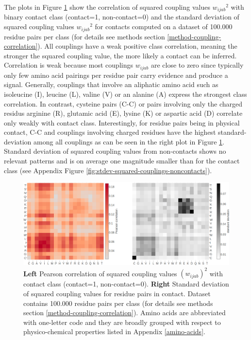 \documentclass[11pt,a4paper,twoside]{book}
\newcommand{\wijab}{w_{ijab}}
\theoremstyle{definition}
\theoremstyle{definition}
\theoremstyle{remark}
\begin{document}
The plots in Figure \ref{fig:sq-coupling-correlation} show the
correlation of squared coupling values \({\wijab}^2\) with binary
contact class (contact=1, non-contact=0) and the standard deviation of
squared coupling values \({\wijab}^2\) for contacts computed on a
dataset of 100.000 residue pairs per class (for details see methods
section \ref{method-coupling-correlation}). All couplings have a weak
positive class correlation, meaning the stronger the squared coupling
value, the more likely a contact can be inferred. Correlation is weak
because most couplings \(\wijab\) are close to zero since typically only
few amino acid pairings per residue pair carry evidence and produce a
signal. Generally, couplings that involve an aliphatic amino acid such
as isoleucine (I), leucine (L), valine (V) or an alanine (A) express the
strongest class correlation. In contrast, cysteine pairs (C-C) or pairs
involving only the charged residus arginine (R), glutamic acid (E),
lysine (K) or aspartic acid (D) correlate only weakly with contact
class. Interestingly, for residue pairs being in physical contact, C-C
and couplings involving charged residues have the highest
standard-deviation among all couplings as can be seen in the right plot
in Figure \ref{fig:sq-coupling-correlation}. Standard deviation of
squared coupling values from non-contacts shows no relevant patterns and
is on average one magnitude smaller than for the contact class (see
Appendix Figure \ref{fig:stdev-squared-couplings-noncontacts}).










\begin{figure}

{\centering \includegraphics[width=1\linewidth]{img/coupling_matrix_analysis/combi_squared_couplings_correlation_and_stddev_heatmap_notitle} 

}

\caption{\textbf{Left} Pearson correlation of squared
coupling values \((\wijab)^2\) with contact class (contact=1,
non-contact=0). \textbf{Right} Standard deviation of squared coupling
values for residue pairs in contact. Dataset contains 100.000 residue
pairs per class (for details see methods section
\ref{method-coupling-correlation}). Amino acids are abbreviated with
one-letter code and they are broadly grouped with respect to
physico-chemical properties listed in Appendix \ref{amino-acids}.}\label{fig:sq-coupling-correlation}
\end{figure}
\end{document}
